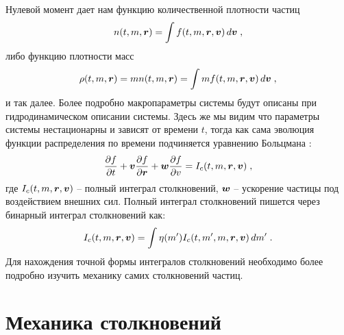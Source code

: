 Нулевой момент дает нам функцию количественной плотности частиц
\begin{equation}
  n(t, m,\bm{r}) = \int f(t, m,\bm{r},\bm{v})\,d\bm{v}\;,
\end{equation}
либо функцию плотности масс
\begin{equation}
  \rho(t, m,\bm{r}) = mn(t, m,\bm{r})=\int mf(t, m,\bm{r},\bm{v})\,d\bm{v}\;,
\end{equation}
и так далее. Более подробно макропараметры системы будут описаны при гидродинамическом описании системы.
Здесь же мы видим что параметры системы нестационарны и зависят от времени $t$, тогда как сама эволюция
функции распределения по времени подчиняется уравнению Больцмана \cite{Spahn:2004euro_lett_kinetic_fraggr,Dilley:1993icarus_energy_loss}:
\begin{equation}\label{eq:Boltzmann_general}
  \frac{\partial f}{\partial t} + \bm{v}\frac{\partial f}{\partial\bm{r}} + \bm{w}\frac{\partial f}{\partial v} = I_c(t,m,\bm{r},\bm{v})\;,
\end{equation}
где $I_c(t,m,\bm{r},\bm{v})$ -- полный интеграл столкновений, $\bm{w}$ -- ускорение частицы под воздействием внешних сил.
Полный интеграл столкновений пишется через бинарный интеграл столкновений как:
\begin{equation}
  I_c(t,m,\bm{r},\bm{v}) = \int\eta(m')I_c(t,m',m,\bm{r},\bm{v})\,dm'\;.
\end{equation}
Для нахождения точной формы интегралов столкновений необходимо более подробно изучить механику самих столкновений частиц.

\section{Механика столкновений}

